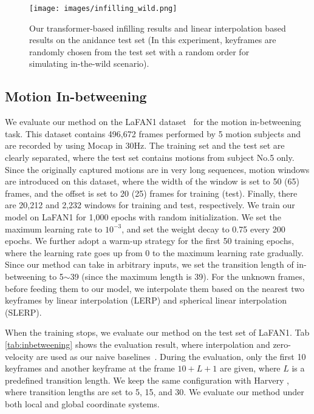 \documentclass[10pt,twocolumn,letterpaper]{article}
\begin{document}
\begin{figure*}[ht]
  \centering
  \texttt{[image: images/infilling\_wild.png]}
  \caption{Our transformer-based infilling results and linear interpolation based results on the anidance test set (In this experiment, keyframes are randomly chosen from the test set with a random order for simulating in-the-wild scenario).}
  \label{fig:infilling_wild}
\end{figure*}

\subsection{Motion In-betweening} \label{Sec:in-betweening}

We evaluate our method on the LaFAN1 dataset~\cite{harvey2020robust} for the motion in-betweening task. This dataset contains 496,672 frames performed by 5 motion subjects and are recorded by using Mocap in 30Hz. The training set and the test set are clearly separated, where the test set contains motions from subject No.5 only. Since the originally captured motions are in very long sequences, motion windows are introduced on this dataset, where the width of the window is set to 50 (65) frames, and the offset is set to 20 (25) frames for training (test). Finally, there are 20,212 and 2,232 windows for training and test, respectively. We train our model on LaFAN1 for 1,000 epochs with random initialization. We set the maximum learning rate to $10^{-3}$, and set the weight decay to 0.75 every 200 epochs. We further adopt a warm-up strategy for the first 50 training epochs, where the learning rate goes up from 0 to the maximum learning rate gradually. Since our method can take in arbitrary inputs, we set the transition length of in-betweening to 5$\sim$39 (since the maximum length is 39). For the unknown frames, before feeding them to our model, we interpolate them based on the nearest two keyframes by linear interpolation (LERP) and spherical linear interpolation (SLERP).

When the training stops, we evaluate our method on the test set of LaFAN1. Tab \ref{tab:inbetweening} shows the evaluation result, where interpolation and zero-velocity are used as our naive baselines~\cite{harvey2020robust}. During the evaluation, only the first 10 keyframes and another keyframe at the frame $10+L+1$ are given, where $L$ is a predefined transition length. We keep the same configuration with Harvery \etal, where transition lengths are set to 5, 15, and 30. We evaluate our method under both local and global coordinate systems.
\end{document}
